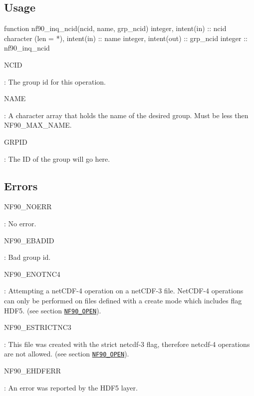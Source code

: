 \subsection*{Usage}


\begin{DoxyCode}
\textcolor{keyword}{function }nf90\_inq\_ncid(ncid, name, grp\_ncid)
  \textcolor{keywordtype}{integer}, \textcolor{keywordtype}{intent(in)} :: ncid
  \textcolor{keywordtype}{character (len = *)}, \textcolor{keywordtype}{intent(in)} :: name
  \textcolor{keywordtype}{integer}, \textcolor{keywordtype}{intent(out)} :: grp\_ncid
  \textcolor{keywordtype}{integer} :: nf90\_inq\_ncid
\end{DoxyCode}


{\ttfamily N\+C\+ID}

\+: The group id for this operation.

{\ttfamily N\+A\+ME}

\+: A character array that holds the name of the desired group. Must be less then N\+F90\+\_\+\+M\+A\+X\+\_\+\+N\+A\+ME.

{\ttfamily G\+R\+P\+ID}

\+: The ID of the group will go here.

\subsection*{Errors}

{\ttfamily N\+F90\+\_\+\+N\+O\+E\+RR}

\+: No error.

{\ttfamily N\+F90\+\_\+\+E\+B\+A\+D\+ID}

\+: Bad group id.

{\ttfamily N\+F90\+\_\+\+E\+N\+O\+T\+N\+C4}

\+: Attempting a net\+C\+D\+F-\/4 operation on a net\+C\+D\+F-\/3 file. Net\+C\+D\+F-\/4 operations can only be performed on files defined with a create mode which includes flag H\+D\+F5. (see section \href{#NF90_005fOPEN}{\tt N\+F90\+\_\+\+O\+P\+EN}).

{\ttfamily N\+F90\+\_\+\+E\+S\+T\+R\+I\+C\+T\+N\+C3}

\+: This file was created with the strict netcdf-\/3 flag, therefore netcdf-\/4 operations are not allowed. (see section \href{#NF90_005fOPEN}{\tt N\+F90\+\_\+\+O\+P\+EN}).

{\ttfamily N\+F90\+\_\+\+E\+H\+D\+F\+E\+RR}

\+: An error was reported by the H\+D\+F5 layer.

